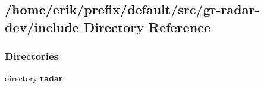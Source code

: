 \subsection{/home/erik/prefix/default/src/gr-\/radar-\/dev/include Directory Reference}
\label{dir_52f57cb1235b70ef72fa63cc3c6ab583}
\subsubsection*{Directories}
\begin{DoxyCompactItemize}
\item 
directory {\bf radar}
\end{DoxyCompactItemize}
